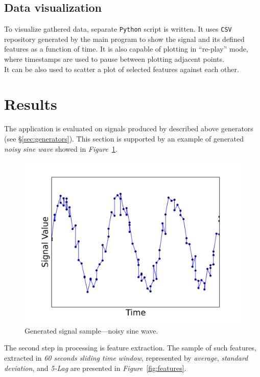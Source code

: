 \documentclass[11pt, letterpaper]{article}            %
\begin{document}
\subsection{Data visualization}
To visualize gathered data, separate \texttt{Python} script is written. It uses \texttt{CSV} repository generated by the main program to show the signal and its defined features as a function of time. It is also capable of plotting in ``re-play'' mode, where timestamps are used to pause between plotting adjacent points.\\
It can be also used to scatter a plot of selected features against each other.\\


\section{Results}
The application is evaluated on signals produced by described above generators (see §\ref{sec:generators}). This section is supported by an example of generated \emph{noisy sine wave} showed in \emph{Figure}~\ref{fig:signal}.\\

\begin{figure}[htbp]
  \centering
  \includegraphics[width=.7\textwidth]{./gfx/feature5.png}
  \caption{Generated signal sample---noisy sine wave.\label{fig:signal}}
\end{figure}

The second step in processing is feature extraction. The sample of such features, extracted in \emph{60 seconds sliding time window}, represented by \emph{average}, \emph{standard deviation}, and \emph{5-Lag} are presented in \emph{Figure}~\ref{fig:features}.\\
\end{document}
